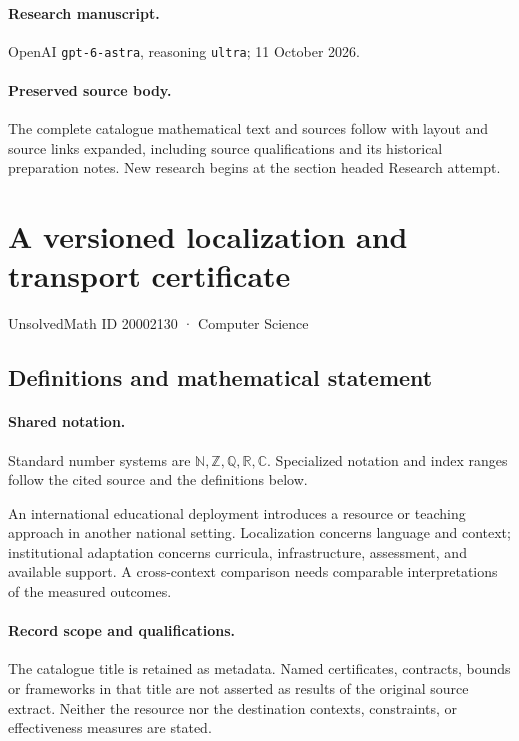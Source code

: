 \documentclass[11pt]{article}
\begin{document}
\paragraph{Research manuscript.} OpenAI \texttt{gpt-6-astra}, reasoning \texttt{ultra}; 11 October 2026.
\paragraph{Preserved source body.} The complete catalogue mathematical text and sources follow with layout and source links expanded, including source qualifications and its historical preparation notes. New research begins at the section headed Research attempt.

\section{A versioned localization and transport certificate}\label{20002130}
{\small UnsolvedMath ID 20002130 · Computer Science}
\subsection{Definitions and mathematical statement}

\paragraph{Shared notation.}Standard number systems are $\mathbb N,\mathbb Z,\mathbb Q,\mathbb R,\mathbb C$. Specialized notation and index ranges follow the cited source and the definitions below.


An international educational deployment introduces a resource or teaching approach in another national setting. Localization concerns language and context; institutional adaptation concerns curricula, infrastructure, assessment, and available support. A cross-context comparison needs comparable interpretations of the measured outcomes.
\paragraph{Record scope and qualifications.}
The catalogue title is retained as metadata. Named certificates, contracts, bounds or frameworks in that title are not asserted as results of the original source extract.
Neither the resource nor the destination contexts, constraints, or effectiveness measures are stated.
\end{document}
